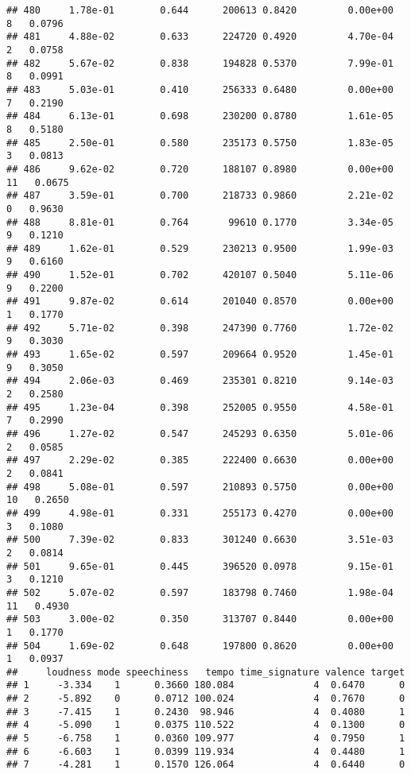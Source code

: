 \documentclass[
]{article}
\begin{document}
\begin{verbatim}
## 480     1.78e-01        0.644      200613 0.8420         0.00e+00   8   0.0796
## 481     4.88e-02        0.633      224720 0.4920         4.70e-04   2   0.0758
## 482     5.67e-02        0.838      194828 0.5370         7.99e-01   8   0.0991
## 483     5.03e-01        0.410      256333 0.6480         0.00e+00   7   0.2190
## 484     6.13e-01        0.698      230200 0.8780         1.61e-05   8   0.5180
## 485     2.50e-01        0.580      235173 0.5750         1.83e-05   3   0.0813
## 486     9.62e-02        0.720      188107 0.8980         0.00e+00  11   0.0675
## 487     3.59e-01        0.700      218733 0.9860         2.21e-02   0   0.9630
## 488     8.81e-01        0.764       99610 0.1770         3.34e-05   9   0.1210
## 489     1.62e-01        0.529      230213 0.9500         1.99e-03   9   0.6160
## 490     1.52e-01        0.702      420107 0.5040         5.11e-06   9   0.2200
## 491     9.87e-02        0.614      201040 0.8570         0.00e+00   1   0.1770
## 492     5.71e-02        0.398      247390 0.7760         1.72e-02   9   0.3030
## 493     1.65e-02        0.597      209664 0.9520         1.45e-01   9   0.3050
## 494     2.06e-03        0.469      235301 0.8210         9.14e-03   2   0.2580
## 495     1.23e-04        0.398      252005 0.9550         4.58e-01   7   0.2990
## 496     1.27e-02        0.547      245293 0.6350         5.01e-06   2   0.0585
## 497     2.29e-02        0.385      222400 0.6630         0.00e+00   2   0.0841
## 498     5.08e-01        0.597      210893 0.5750         0.00e+00  10   0.2650
## 499     4.98e-01        0.331      255173 0.4270         0.00e+00   3   0.1080
## 500     7.39e-02        0.833      301240 0.6630         3.51e-03   2   0.0814
## 501     9.65e-01        0.445      396520 0.0978         9.15e-01   3   0.1210
## 502     5.07e-02        0.597      183798 0.7460         1.98e-04  11   0.4930
## 503     3.00e-02        0.350      313707 0.8440         0.00e+00   1   0.1770
## 504     1.69e-02        0.648      197800 0.8620         0.00e+00   1   0.0937
##     loudness mode speechiness   tempo time_signature valence target
## 1     -3.334    1      0.3660 180.084              4  0.6470      0
## 2     -5.892    0      0.0712 100.024              4  0.7670      0
## 3     -7.415    1      0.2430  98.946              4  0.4080      1
## 4     -5.090    1      0.0375 110.522              4  0.1300      0
## 5     -6.758    1      0.0360 109.977              4  0.7950      1
## 6     -6.603    1      0.0399 119.934              4  0.4480      1
## 7     -4.281    1      0.1570 126.064              4  0.6440      0

\end{verbatim}
\end{document}
